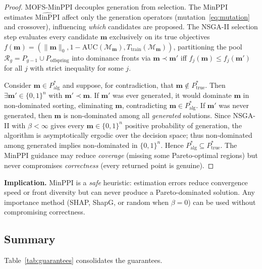 \documentclass{article} %
\begin{document}
\begin{proof}
MOFS-MinPPI decouples generation from selection. The MinPPI estimates $\widehat{\text{MinPPI}}$ affect only the generation operators (mutation~\eqref{eq:mutation} and crossover), influencing \emph{which} candidates are proposed. The NSGA-II selection step evaluates every candidate $\mathbf{m}$ exclusively on its true objectives $f(\mathbf{m}) = (\|\mathbf{m}\|_0, 1 - \text{AUC}(\mathcal{M}_{\mathbf{m}}), T_{\text{train}}(\mathcal{M}_{\mathbf{m}}))$, partitioning the pool $\mathcal{R}_g = P_{g-1} \cup P_{\text{offspring}}$ into dominance fronts via $\mathbf{m} \prec \mathbf{m}'$ iff $f_j(\mathbf{m}) \leq f_j(\mathbf{m}')$ for all $j$ with strict inequality for some $j$.

Consider $\mathbf{m} \in P^*_{\text{alg}}$ and suppose, for contradiction, that $\mathbf{m} \notin P^*_{\text{true}}$. Then $\exists \mathbf{m}' \in \{0,1\}^n$ with $\mathbf{m}' \prec \mathbf{m}$. If $\mathbf{m}'$ was ever generated, it would dominate $\mathbf{m}$ in non-dominated sorting, eliminating $\mathbf{m}$, contradicting $\mathbf{m} \in P^*_{\text{alg}}$. If $\mathbf{m}'$ was never generated, then $\mathbf{m}$ is non-dominated among all \emph{generated} solutions. Since NSGA-II with $\beta < \infty$ gives every $\mathbf{m} \in \{0,1\}^n$ positive probability of generation, the algorithm is asymptotically ergodic over the decision space; thus non-dominated among generated implies non-dominated in $\{0,1\}^n$. Hence $P^*_{\text{alg}} \subseteq P^*_{\text{true}}$. The MinPPI guidance may reduce \emph{coverage} (missing some Pareto-optimal regions) but never compromises \emph{correctness} (every returned point is genuine).
\end{proof}

\textbf{Implication.} MinPPI is a \emph{safe} heuristic: estimation errors reduce convergence speed or front diversity but can never produce a Pareto-dominated solution. Any importance method (SHAP, ShapG, or random when $\beta=0$) can be used without compromising correctness.

\subsection{Summary}

Table~\ref{tab:guarantees} consolidates the guarantees.
\end{document}
